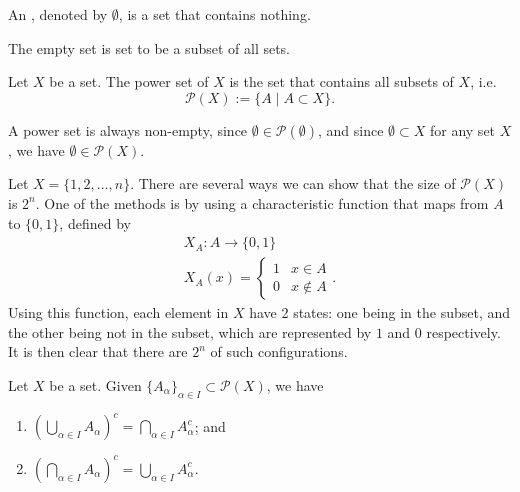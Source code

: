 \documentclass[notoc,notitlepage]{tufte-book}
\begin{document}
\begin{defn}\label{defn:empty_set}
  An , denoted by $\emptyset$, is a set that contains nothing.
\end{defn}

\begin{note}
  The empty set is set to be a subset of all sets.
\end{note}

\begin{defn}\label{defn:power_set}
  Let $X$ be a set. The power set of $X$ is the set that contains all subsets of $X$, i.e.
  \begin{equation*}
    \mathcal{P}(X) := \{ A \mid A \subset X \}.
  \end{equation*}
\end{defn}

\begin{note}
  A power set is always non-empty, since $\emptyset \in \mathcal{P}(\emptyset)$, and since $\emptyset \subset X$ for any set $X$, we have $\emptyset \in \mathcal{P}(X)$.
\end{note}

\begin{eg}
  Let $X = \{1, 2, \ldots, n\}$. There are several ways we can show that the size of $\mathcal{P}(X)$ is $2^n$. One of the methods is by using a characteristic function that maps from $A$ to $\{0, 1\}$, defined by
  \begin{gather*}
    X_A: A \to \{0, 1\} \\
    X_A(x) = \begin{cases}
      1 & x \in A \\
      0 & x \notin A
    \end{cases}.
  \end{gather*}
  Using this function, each element in $X$ have 2 states: one being in the subset, and the other being not in the subset, which are represented by $1$ and $0$ respectively. It is then clear that there are $2^n$ of such configurations.
\end{eg}

\begin{thm}\label{thm:de_morgan_s_laws}
  Let $X$ be a set. Given ${\{A_\alpha\}}_{\alpha \in I} \subset \mathcal{P}(X)$, we have
  \begin{enumerate}
    \item ${\left( \bigcup\limits_{\alpha \in I} A_\alpha \right)}^c = \bigcap\limits_{\alpha \in I} A_\alpha^c$; and
    \item ${\left( \bigcap\limits_{\alpha \in I} A_\alpha \right)}^c = \bigcup\limits_{\alpha \in I} A_\alpha^c$.
  \end{enumerate}
\end{thm}
\end{document}
